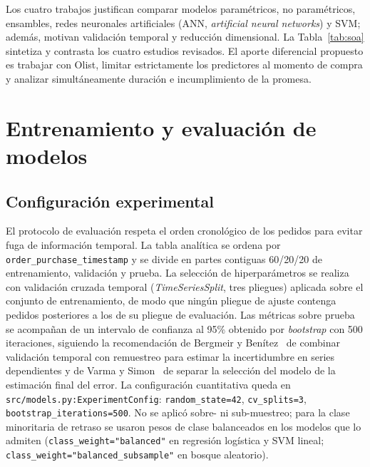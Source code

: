 \documentclass[journal]{IEEEtran}
\begin{document}
Los cuatro trabajos justifican comparar modelos paramétricos, no paramétricos, ensambles, redes neuronales artificiales (ANN, \textit{artificial neural networks}) y SVM; además, motivan validación temporal y reducción dimensional. La Tabla~\ref{tab:soa} sintetiza y contrasta los cuatro estudios revisados. El aporte diferencial propuesto es trabajar con Olist, limitar estrictamente los predictores al momento de compra y analizar simultáneamente duración e incumplimiento de la promesa.

\section{Entrenamiento y evaluación de modelos}
\label{sec:entrenamiento}

\subsection{Configuración experimental}
\label{sec:config}

El protocolo de evaluación respeta el orden cronológico de los pedidos para evitar fuga de información temporal. La tabla analítica se ordena por \texttt{order\_purchase\_timestamp} y se divide en partes contiguas 60/20/20 de entrenamiento, validación y prueba. La selección de hiperparámetros se realiza con validación cruzada temporal (\textit{TimeSeriesSplit}, tres pliegues) aplicada sobre el conjunto de entrenamiento, de modo que ningún pliegue de ajuste contenga pedidos posteriores a los de su pliegue de evaluación. Las métricas sobre prueba se acompañan de un intervalo de confianza al 95\% obtenido por \textit{bootstrap} con 500 iteraciones, siguiendo la recomendación de Bergmeir y Benítez~\cite{bergmeir2012} de combinar validación temporal con remuestreo para estimar la incertidumbre en series dependientes y de Varma y Simon~\cite{varma2006} de separar la selección del modelo de la estimación final del error. La configuración cuantitativa queda en \texttt{src/models.py:ExperimentConfig}: \texttt{random\_state=42}, \texttt{cv\_splits=3}, \texttt{bootstrap\_iterations=500}. No se aplicó sobre- ni sub-muestreo; para la clase minoritaria de retraso se usaron pesos de clase balanceados en los modelos que lo admiten (\texttt{class\_weight="balanced"} en regresión logística y SVM lineal; \texttt{class\_weight="balanced\_subsample"} en bosque aleatorio).
\end{document}
